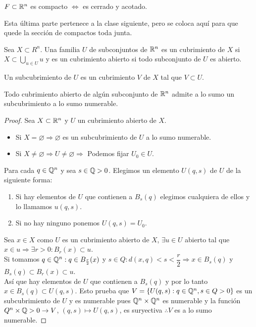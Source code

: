 \begin{corollary}
  \(F \subset \mathbb{R}^n\) es compacto \(\iff \) es cerrado y acotado.
\end{corollary}

Esta última parte pertenece a la clase siguiente, pero se coloca aquí para que quede la sección de compactos toda junta.

\begin{definition}[Cubrimiento]
  Sea \(X \subset R^n\). Una familia \(U\) de subconjuntos de \(\mathbb{R}^n\) es un cubrimiento de \(X\) si \(X \subset \bigcup_{u \in U} u\) y es un cubrimiento abierto si todo subconjunto de \(U\) es abierto.
\end{definition}

\begin{definition}[Subcubrimiento]
  Un subcubrimiento de \(U\) es un cubrimiento \(V\) de \(X\) tal que \(V \subset U\).
\end{definition}

\begin{theorem}[Lindelöf]
  Todo cubrimiento abierto de algún subconjunto de \(\mathbb{R}^n\) admite a lo sumo un subcubrimiento a lo sumo numerable.
  \begin{proof}
    Sea \(X \subset \mathbb{R}^n\) y \(U\) un cubrimiento abierto de \(X\).
    \begin{itemize}
      \item Si \(X = \varnothing \Rightarrow \varnothing \) es un subcubrimiento de \(U\) a lo
            sumo numerable.
      \item Si \(X \neq \varnothing \Rightarrow U \neq \varnothing \Rightarrow \) Podemos
            fijar \(U_0 \in U\).
    \end{itemize}
    Para cada \(q \in \mathbb{Q}^n\) y sea \(s \in \mathbb{Q} > 0\). Elegimos un elemento \(U(q, s)\) de \(U\) de la siguiente forma:
    \begin{enumerate}
      \item Si hay elementos de \(U\) que contienen a \(B_s(q)\) elegimos cualquiera de ellos y
            lo llamamos \(u(q, s)\).
      \item Si no hay ninguno ponemos \(U(q, s) = U_0\).
    \end{enumerate}
    Sea \(x \in X\) como \(U\) es un cubrimiento abierto de \(X\), \(\exists u \in U\) abierto tal que \(x \in u \Rightarrow \exists r > 0 : B_r(x) \subset u\). \\
    Si tomamos \(q \in \mathbb{Q}^n : q \in B_{\frac{r}{2}}(x)\) y \(s \in Q : d(x, q) < s < \dfrac{r}{2} \Rightarrow x \in B_s(q)\) y \(B_s(q) \subset B_r(x) \subset u\). \\
    Así que hay elementos de \(U\) que contienen a \(B_s(q)\) y por lo tanto \(x \in B_s(q) \subset U(q, s)\). Esto prueba que \(V = \{ U(q, s) : q \in \mathbb{Q}^n, s \in Q > 0 \} \) es un subcubrimiento de \(U\) y es numerable pues \(\mathbb{Q}^n \times \mathbb{Q}^n\) es numerable y la función \(Q^n \times \mathbb{Q} > 0 \to V\), \((q, s) \mapsto U(q, s)\), es suryectiva \(\therefore V\) es a lo sumo numerable.
  \end{proof}
\end{theorem}

